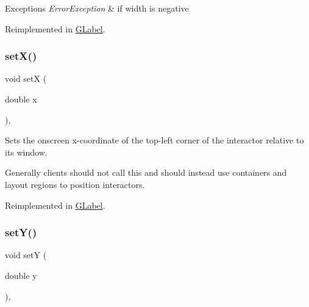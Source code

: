 \begin{DoxyExceptions}{Exceptions}
{\em Error\+Exception} & if width is negative \\
\hline
\end{DoxyExceptions}


Reimplemented in \mbox{\hyperlink{classsgl_1_1GLabel_af0c5b6fb4e3c3c9a3fabde548efa93db}{G\+Label}}.

\mbox{\label{classsgl_1_1GInteractor_a9c18fcc579333bf9653d13ad2b372e39}} 
\subsubsection{\texorpdfstring{set\+X()}{setX()}}
{\footnotesize\ttfamily void setX (\begin{DoxyParamCaption}\item[{double}]{x }\end{DoxyParamCaption})\hspace{0.3cm}{\ttfamily [virtual]}, {\ttfamily [inherited]}}



Sets the onscreen x-\/coordinate of the top-\/left corner of the interactor relative to its window. 

Generally clients should not call this and should instead use containers and layout regions to position interactors. 

Reimplemented in \mbox{\hyperlink{classsgl_1_1GLabel_a173837ba805eaa2411e88834869d3a9c}{G\+Label}}.

\mbox{\label{classsgl_1_1GInteractor_a7d57e2a5c35d27feb58fd498a3cf82b9}} 
\subsubsection{\texorpdfstring{set\+Y()}{setY()}}
{\footnotesize\ttfamily void setY (\begin{DoxyParamCaption}\item[{double}]{y }\end{DoxyParamCaption})\hspace{0.3cm}{\ttfamily [virtual]}, {\ttfamily [inherited]}}



